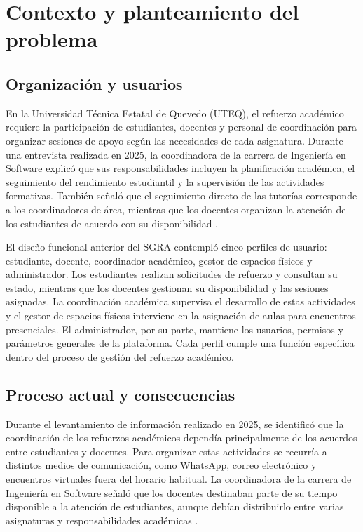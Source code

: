 \section{Contexto y planteamiento del problema}

\subsection{Organización y usuarios}

En la Universidad Técnica Estatal de Quevedo (UTEQ), el refuerzo académico requiere la participación de estudiantes, docentes y personal de coordinación para organizar sesiones de apoyo según las necesidades de cada asignatura. Durante una entrevista realizada en 2025, la coordinadora de la carrera de Ingeniería en Software explicó que sus responsabilidades incluyen la planificación académica, el seguimiento del rendimiento estudiantil y la supervisión de las actividades formativas. También señaló que el seguimiento directo de las tutorías corresponde a los coordinadores de área, mientras que los docentes organizan la atención de los estudiantes de acuerdo con su disponibilidad \cite{Ponce2025-Entrevista}.

El diseño funcional anterior del SGRA contempló cinco perfiles de usuario: estudiante, docente, coordinador académico, gestor de espacios físicos y administrador. Los estudiantes realizan solicitudes de refuerzo y consultan su estado, mientras que los docentes gestionan su disponibilidad y las sesiones asignadas. La coordinación académica supervisa el desarrollo de estas actividades y el gestor de espacios físicos interviene en la asignación de aulas para encuentros presenciales. El administrador, por su parte, mantiene los usuarios, permisos y parámetros generales de la plataforma. Cada perfil cumple una función específica dentro del proceso de gestión del refuerzo académico.

\subsection{Proceso actual y consecuencias}

Durante el levantamiento de información realizado en 2025, se identificó que la coordinación de los refuerzos académicos dependía principalmente de los acuerdos entre estudiantes y docentes. Para organizar estas actividades se recurría a distintos medios de comunicación, como WhatsApp, correo electrónico y encuentros virtuales fuera del horario habitual. La coordinadora de la carrera de Ingeniería en Software señaló que los docentes destinaban parte de su tiempo disponible a la atención de estudiantes, aunque debían distribuirlo entre varias asignaturas y responsabilidades académicas \cite{Ponce2025-Entrevista}.

